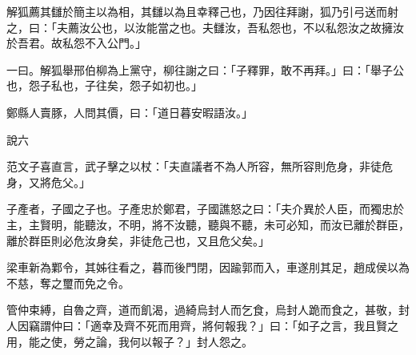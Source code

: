 \begin{pinyinscope}
解狐薦其讎於簡主以為相，其讎以為且幸釋己也，乃因往拜謝，狐乃引弓送而射之，曰：「夫薦汝公也，以汝能當之也。夫讎汝，吾私怨也，不以私怨汝之故擁汝於吾君。故私怨不入公門。」

一曰。解狐舉邢伯柳為上黨守，柳往謝之曰：「子釋罪，敢不再拜。」曰：「舉子公也，怨子私也，子往矣，怨子如初也。」

鄭縣人賣豚，人問其價，曰：「道日暮安暇語汝。」

說六

范文子喜直言，武子擊之以杖：「夫直議者不為人所容，無所容則危身，非徒危身，又將危父。」

子產者，子國之子也。子產忠於鄭君，子國譙怒之曰：「夫介異於人臣，而獨忠於主，主賢明，能聽汝，不明，將不汝聽，聽與不聽，未可必知，而汝已離於群臣，離於群臣則必危汝身矣，非徒危己也，又且危父矣。」

梁車新為鄴令，其姊往看之，暮而後門閉，因踰郭而入，車遂刖其足，趙成侯以為不慈，奪之璽而免之令。

管仲束縛，自魯之齊，道而飢渴，過綺烏封人而乞食，烏封人跪而食之，甚敬，封人因竊謂仲曰：「適幸及齊不死而用齊，將何報我？」曰：「如子之言，我且賢之用，能之使，勞之論，我何以報子？」封人怨之。


\end{pinyinscope}